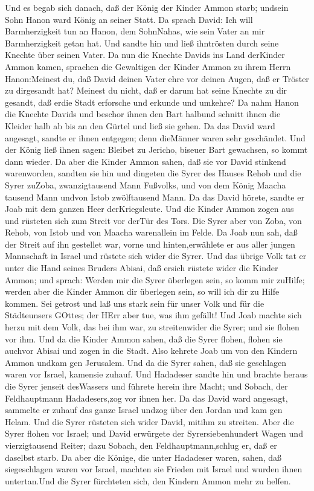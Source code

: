  Und es begab sich danach, daß der König der Kinder Ammon
starb; undsein Sohn Hanon ward König an seiner Statt.  Da
sprach David: Ich will Barmherzigkeit tun an Hanon, dem SohnNahas, wie
sein Vater an mir Barmherzigkeit getan hat. Und sandte hin und ließ
ihntrösten durch seine Knechte über seinen Vater. Da nun die Knechte
Davids ins Land derKinder Ammon kamen,  sprachen die
Gewaltigen der Kinder Ammon zu ihrem Herrn Hanon:Meinest du, daß David
deinen Vater ehre vor deinen Augen, daß er Tröster zu dirgesandt hat?
Meinest du nicht, daß er darum hat seine Knechte zu dir gesandt, daß
erdie Stadt erforsche und erkunde und umkehre?  Da nahm
Hanon die Knechte Davids und beschor ihnen den Bart halbund schnitt
ihnen die Kleider halb ab bis an den Gürtel und ließ sie gehen.
 Da das David ward angesagt, sandte er ihnen entgegen; denn
dieMänner waren sehr geschändet. Und der König ließ ihnen sagen: Bleibet
zu Jericho, biseuer Bart gewachsen, so kommt dann wieder. 
Da aber die Kinder Ammon sahen, daß sie vor David stinkend warenworden,
sandten sie hin und dingeten die Syrer des Hauses Rehob und die Syrer
zuZoba, zwanzigtausend Mann Fußvolks, und von dem König Maacha tausend
Mann undvon Istob zwölftausend Mann.  Da das David hörete,
sandte er Joab mit dem ganzen Heer derKriegsleute.  Und die
Kinder Ammon zogen aus und rüsteten sich zum Streit vor derTür des Tors.
Die Syrer aber von Zoba, von Rehob, von Istob und von Maacha warenallein
im Felde.  Da Joab nun sah, daß der Streit auf ihn gestellet
war, vorne und hinten,erwählete er aus aller jungen Mannschaft in Israel
und rüstete sich wider die Syrer.  Und das übrige Volk tat
er unter die Hand seines Bruders Abisai, daß ersich rüstete wider die
Kinder Ammon;  und sprach: Werden mir die Syrer überlegen
sein, so komm mir zuHilfe; werden aber die Kinder Ammon dir überlegen
sein, so will ich dir zu Hilfe kommen.  Sei getrost und laß
uns stark sein für unser Volk und für die Städteunsers GOttes; der HErr
aber tue, was ihm gefällt!  Und Joab machte sich herzu mit
dem Volk, das bei ihm war, zu streitenwider die Syrer; und sie flohen
vor ihm.  Und da die Kinder Ammon sahen, daß die Syrer
flohen, flohen sie auchvor Abisai und zogen in die Stadt. Also kehrete
Joab um von den Kindern Ammon undkam gen Jerusalem.  Und da
die Syrer sahen, daß sie geschlagen waren vor Israel, kamensie zuhauf.
 Und Hadadeser sandte hin und brachte heraus die Syrer
jenseit desWassers und führete herein ihre Macht; und Sobach, der
Feldhauptmann Hadadesers,zog vor ihnen her.  Da das David
ward angesagt, sammelte er zuhauf das ganze Israel undzog über den
Jordan und kam gen Helam. Und die Syrer rüsteten sich wider David,
mitihm zu streiten.  Aber die Syrer flohen vor Israel; und
David erwürgete der Syrersiebenhundert Wagen und vierzigtausend Reiter;
dazu Sobach, den Feldhauptmann,schlug er, daß er daselbst starb.
 Da aber die Könige, die unter Hadadeser waren, sahen, daß
siegeschlagen waren vor Israel, machten sie Frieden mit Israel und
wurden ihnen untertan.Und die Syrer fürchteten sich, den Kindern Ammon
mehr zu helfen.


